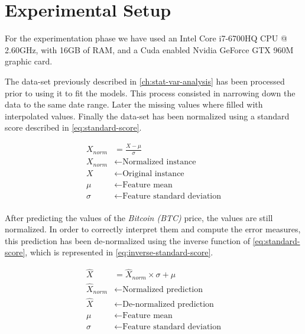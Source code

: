 
\chapter{Experimental Setup}
\label{ch:experimental-setup}

For the experimentation phase we have used an Intel Core i7-6700HQ CPU
@ 2.60GHz, with 16GB of RAM, and a Cuda enabled Nvidia GeForce GTX
960M graphic card.

The data-set previously described in \autoref{ch:stat-var-analysis}
has been processed prior to using it to fit the models. This process
consisted in narrowing down the data to the same date range. Later the
missing values where filled with interpolated values. Finally the
data-set has been normalized using a standard score described in
\autoref{eq:standard-score}.

\begin{equation}
  \begin{aligned}
    \label{eq:standard-score} X_{norm} & = \frac{X-\mu}{\sigma} \\
X_{norm} & \leftarrow \text{Normalized instance} \\ X & \leftarrow
\text{Original instance} \\ \mu & \leftarrow \text{Feature mean} \\
\sigma & \leftarrow \text{Feature standard deviation} \\
  \end{aligned}
\end{equation}

After predicting the values of the \textit{Bitcoin (BTC)} price, the
values are still normalized. In order to correctly interpret them and
compute the error measures, this prediction has been de-normalized
using the inverse function of \autoref{eq:standard-score}, which is
represented in \autoref{eq:inverse-standard-score}.

\begin{equation}
  \begin{aligned}
    \label{eq:inverse-standard-score}
    \hat{X} & = \hat{X}_{norm} \times \sigma + \mu \\
    \hat{X}_{norm} & \leftarrow \text{Normalized prediction} \\
    \hat{X} & \leftarrow \text{De-normalized prediction} \\
    \mu & \leftarrow \text{Feature mean} \\
    \sigma & \leftarrow\text{Feature standard deviation} \\
  \end{aligned}
\end{equation}

